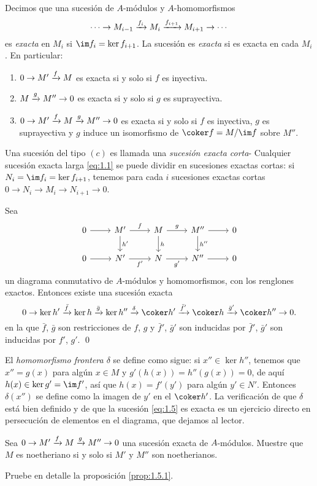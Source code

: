 Decimos que una sucesión de $A$-módulos y $A$-homomorfismos
\begin{equation} \label{eq:1.1}
  \cdots \to M_{i-1}
    \xrightarrow{f_i} M_i 
    \xrightarrow{f_{i+1}} M_{i+1}
    \to \cdots  
\end{equation}
es \emph{exacta} en $M_i$ si $\im f_i = \ker f_{i+1}$. La sucesión es \emph{exacta} si es exacta en cada $M_i$. En particular:
\begin{enumerate}
  \item $0 \to M' \xrightarrow{f} M $ es exacta si y solo si $f$ es inyectiva.
  \item $M \xrightarrow{g} M'' \to 0$ es exacta si y solo si $g$ es suprayectiva.
  \item $0 \to M' \xrightarrow{f} M \xrightarrow{g} M'' \to 0$ es exacta si y solo si $f$ es inyectiva, $g$ es suprayectiva y $g$ induce un isomorfismo de $\coker f = M / \im f$ sobre $M''$.
\end{enumerate}

Una sucesión del tipo $(c)$ es llamada una \emph{sucesión exacta corta}- Cualquier sucesión exacta larga \eqref{eq:1.1} se puede dividir en sucesiones exactas cortas: si $N_i = \im f_i = \ker f_{i+1}$, tenemos para cada $i$ sucesiones exactas cortas $0 \to N_i \to M_i \to N_{i+1} \to 0$.

\begin{lemma}[de la serpiente] \label{prop:1.5.1}
  Sea 
  \[
    \begin{tikzcd}
      0 \arrow[r] & M' \arrow[r, "f"] \arrow[d, "h'"] & M \arrow[r, "g"] \arrow[d, "h"] & M'' \arrow[r] \arrow[d, "h''"] & 0 \\
      0 \arrow[r] & N' \arrow[r, "f'"']               & N \arrow[r, "g'"']              & N'' \arrow[r]                  & 0
    \end{tikzcd}
  \]
  un diagrama conmutativo de $A$-módulos y homomorfismos, con los renglones exactos. Entonces existe una sucesión exacta
  \begin{equation}\label{eq:1.5}
    0 \to \ker h' \labto{\bar f} \ker h \labto{\bar g} \ker h'' \labto{\delta} 
      \coker h' \labto{\bar f'} \coker h \labto{\bar g'} \coker h'' \to 0.
  \end{equation}
  en la que $\bar f$, $\bar g$ son restricciones de $f$, $g$ y $\bar f'$, $\bar g'$ son inducidas por $\bar f'$, $\bar g'$ son inducidas por $f'$, $g'$. \qed
\end{lemma}

El \emph{homomorfismo frontera $\delta$} se define como sigue: si $x'' \in \ker h''$, tenemos que $x'' = g(x)$ para algún $x \in M$ y $g'(h(x)) = h''(g(x)) = 0$, de aquí $h(x) \in \ker g' = \im f'$, así que $h(x) = f'(y')$ para algún $y' \in N'$. Entonces $\delta(x'')$ se define como la imagen de $y'$ en el $\coker h'$. La verificación de que $\delta$ está bien definido y de que la sucesión \eqref{eq:1.5} es exacta es un ejercicio directo en persecución de elementos en el diagrama, que dejamos al lector.



\ExerciseSection

\begin{exerciseList}
  \item Sea $0 \to M' \xrightarrow{f} M \xrightarrow{g} M'' \to 0$ una sucesión exacta de $A$-módulos. Muestre que $M$ es noetheriano si y solo si $M'$ y $M''$ son noetherianos.
  \item Pruebe en detalle la proposición \ref{prop:1.5.1}.
\end{exerciseList}